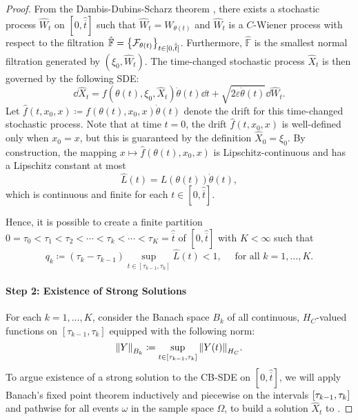 \begin{proof}
  From the Dambis-Dubins-Scharz theorem \citep{dubins1965continuous}, there exists a stochastic process \(\hat{W}_{t}\) on \([0, \hat{\overline{t}}]\) such that \(\hat{W}_{t} = W_{\theta(t)}\) and \(\hat{W}_{t}\) is a \(C\)-Wiener process with respect to the filtration \(\hat{\mathbb{F}} = \qty{\mathcal{F}_{\theta(t)}}_{t \in [0, \hat{\overline{t}}]}\). Furthermore, \(\hat{\mathbb{F}}\) is the smallest normal filtration generated by \((\xi_{0}, \hat{W}_{t})\). The time-changed stochastic process \(\hat{X}_{t}\) is then governed by the following SDE:
  \begin{equation}
    \dd{ \hat{X}_{t}} = f(\theta(t), \xi_{0}, \hat{X}_{t}) \dot{\theta}(t) \dd{t} + \sqrt{2\varepsilon \dot{\theta}(t)} \dd{ \hat{W}_{t}}. \label{eqn:tcforward}
  \end{equation}
  Let \(\hat{f}(t, x_{0}, x) \coloneqq f(\theta(t), x_{0}, x)\dot{\theta}(t)\) denote the drift for this time-changed stochastic process.  Note that at time \(t = 0\), the drift \(\hat{f}(t, x_{0}, x)\) is well-defined only when \(x_{0} = x\), but this is guaranteed by the definition \(\hat{X}_{0} = \xi_{0}\). By construction, the mapping \(x \mapsto \hat{f}(\theta(t), x_{0}, x)\) is Lipschitz-continuous and has a Lipschitz constant at most
  \begin{equation}\hat{L}(t) = L(\theta(t))\dot{\theta}(t), \label{eqn:defLhatt}
  \end{equation} which is continuous and finite for each \(t \in [0, \hat{\overline{t}}]\).

  Hence, it is possible to create a finite partition \(0 = \tau_{0} < \tau_{1} < \tau_{2} < \cdots < \tau_{k} < \cdots < \tau_{K} = \hat{\overline{t}}\) of \([0, \hat{\overline{t}}]\) with \(K < \infty\) such that
  \[
    q_{k} \coloneqq (\tau_{k} - \tau_{k-1}) \sup_{t \in [\tau_{k-1}, \tau_{k}]} \hat{L}(t) < 1, \quad \text{ for all } k = 1, \ldots, K.
  \]

  \paragraph{Step 2: Existence of Strong Solutions}

  For each \(k = 1, \ldots, K\), consider the Banach space \(B_{k}\) of all continuous, \(H_{C}\)-valued functions on \([\tau_{k-1}, \tau_{k}]\) equipped with the following norm:
  \[\norm{Y}_{B_{k}} \coloneqq \sup_{t \in [\tau_{k-1}, \tau_{k}]} \norm{Y(t)}_{H_{C}}.\]
  To argue existence of a strong solution to the CB-SDE on \([0, \hat{\overline{t}}]\), we will apply Banach's fixed point theorem inductively and piecewise on the intervals \(\qty[\tau_{k-1}, \tau_{k}]\) and pathwise for all events \(\omega\) in the sample space \(\Omega\), to build a solution \(\hat{X}_{t}\) to .


\end{proof}
